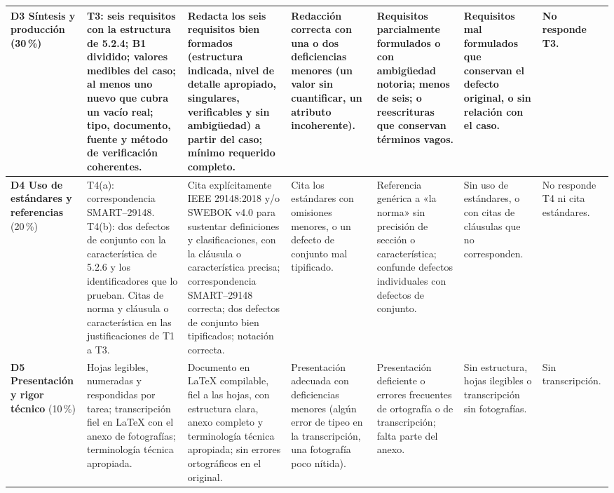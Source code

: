 \documentclass[11pt]{article}
\begin{document}
\begin{landscape}
{\begin{longtable}{|L{2.6cm}|L{4.3cm}|L{3.5cm}|L{3.2cm}|L{3.2cm}|L{3.0cm}|L{1.8cm}|}
			\hline
			\textbf{D3 Síntesis y producción} (30\,\%) & T3: seis requisitos con la estructura de 5.2.4; B1 dividido; valores medibles del caso; al menos uno nuevo que cubra un vacío real; tipo, documento, fuente y método de verificación coherentes. & Redacta los seis requisitos bien formados (estructura indicada, nivel de detalle apropiado, singulares, verificables y sin ambigüedad) a partir del caso; mínimo requerido completo. & Redacción correcta con una o dos deficiencias menores (un valor sin cuantificar, un atributo incoherente). & Requisitos parcialmente formulados o con ambigüedad notoria; menos de seis; o reescrituras que conservan términos vagos. & Requisitos mal formulados que conservan el defecto original, o sin relación con el caso. & No responde T3.\\
			\hline
			\textbf{D4 Uso de estándares y referencias} (20\,\%) & T4(a): correspondencia SMART--29148. T4(b): dos defectos de conjunto con la característica de 5.2.6 y los identificadores que lo prueban. Citas de norma y cláusula o característica en las justificaciones de T1 a T3. & Cita explícitamente IEEE 29148:2018 y/o SWEBOK v4.0 para sustentar definiciones y clasificaciones, con la cláusula o característica precisa; correspondencia SMART--29148 correcta; dos defectos de conjunto bien tipificados; notación correcta. & Cita los estándares con omisiones menores, o un defecto de conjunto mal tipificado. & Referencia genérica a «la norma» sin precisión de sección o característica; confunde defectos individuales con defectos de conjunto. & Sin uso de estándares, o con citas de cláusulas que no corresponden. & No responde T4 ni cita estándares.\\
			\hline
			\textbf{D5 Presentación y rigor técnico} (10\,\%) & Hojas legibles, numeradas y respondidas por tarea; transcripción fiel en \LaTeX{} con el anexo de fotografías; terminología técnica apropiada. & Documento en \LaTeX{} compilable, fiel a las hojas, con estructura clara, anexo completo y terminología técnica apropiada; sin errores ortográficos en el original. & Presentación adecuada con deficiencias menores (algún error de tipeo en la transcripción, una fotografía poco nítida). & Presentación deficiente o errores frecuentes de ortografía o de transcripción; falta parte del anexo. & Sin estructura, hojas ilegibles o transcripción sin fotografías. & Sin transcripción.\\
			\hline
		\end{longtable}
	}
\end{landscape}
\end{document}
